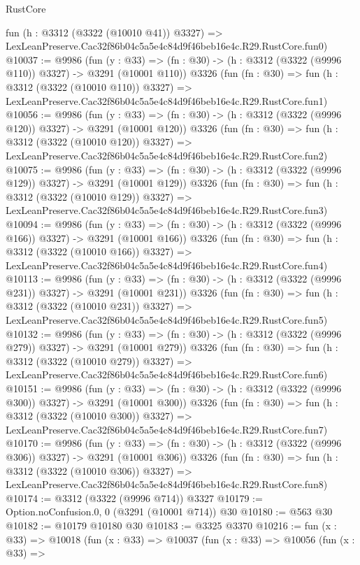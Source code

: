 \begin{lexlean}{RustCore}
\begin{coremodule}
    fun (h : @3312 (@3322 (@10010 @41)) @3327) =>
    LexLeanPreserve.Cac32f86b04c5a5e4c84d9f46beb16e4c.R29.RustCore.fun0)
@10037 := @9986
    (fun (y : @33) => (fn : @30) -> (h : @3312 (@3322 (@9996 @110)) @3327) -> @3291 (@10001 @110))
    @3326
    (fun (fn : @30) =>
    fun (h : @3312 (@3322 (@10010 @110)) @3327) =>
    LexLeanPreserve.Cac32f86b04c5a5e4c84d9f46beb16e4c.R29.RustCore.fun1)
@10056 := @9986
    (fun (y : @33) => (fn : @30) -> (h : @3312 (@3322 (@9996 @120)) @3327) -> @3291 (@10001 @120))
    @3326
    (fun (fn : @30) =>
    fun (h : @3312 (@3322 (@10010 @120)) @3327) =>
    LexLeanPreserve.Cac32f86b04c5a5e4c84d9f46beb16e4c.R29.RustCore.fun2)
@10075 := @9986
    (fun (y : @33) => (fn : @30) -> (h : @3312 (@3322 (@9996 @129)) @3327) -> @3291 (@10001 @129))
    @3326
    (fun (fn : @30) =>
    fun (h : @3312 (@3322 (@10010 @129)) @3327) =>
    LexLeanPreserve.Cac32f86b04c5a5e4c84d9f46beb16e4c.R29.RustCore.fun3)
@10094 := @9986
    (fun (y : @33) => (fn : @30) -> (h : @3312 (@3322 (@9996 @166)) @3327) -> @3291 (@10001 @166))
    @3326
    (fun (fn : @30) =>
    fun (h : @3312 (@3322 (@10010 @166)) @3327) =>
    LexLeanPreserve.Cac32f86b04c5a5e4c84d9f46beb16e4c.R29.RustCore.fun4)
@10113 := @9986
    (fun (y : @33) => (fn : @30) -> (h : @3312 (@3322 (@9996 @231)) @3327) -> @3291 (@10001 @231))
    @3326
    (fun (fn : @30) =>
    fun (h : @3312 (@3322 (@10010 @231)) @3327) =>
    LexLeanPreserve.Cac32f86b04c5a5e4c84d9f46beb16e4c.R29.RustCore.fun5)
@10132 := @9986
    (fun (y : @33) => (fn : @30) -> (h : @3312 (@3322 (@9996 @279)) @3327) -> @3291 (@10001 @279))
    @3326
    (fun (fn : @30) =>
    fun (h : @3312 (@3322 (@10010 @279)) @3327) =>
    LexLeanPreserve.Cac32f86b04c5a5e4c84d9f46beb16e4c.R29.RustCore.fun6)
@10151 := @9986
    (fun (y : @33) => (fn : @30) -> (h : @3312 (@3322 (@9996 @300)) @3327) -> @3291 (@10001 @300))
    @3326
    (fun (fn : @30) =>
    fun (h : @3312 (@3322 (@10010 @300)) @3327) =>
    LexLeanPreserve.Cac32f86b04c5a5e4c84d9f46beb16e4c.R29.RustCore.fun7)
@10170 := @9986
    (fun (y : @33) => (fn : @30) -> (h : @3312 (@3322 (@9996 @306)) @3327) -> @3291 (@10001 @306))
    @3326
    (fun (fn : @30) =>
    fun (h : @3312 (@3322 (@10010 @306)) @3327) =>
    LexLeanPreserve.Cac32f86b04c5a5e4c84d9f46beb16e4c.R29.RustCore.fun8)
@10174 := @3312 (@3322 (@9996 @714)) @3327
@10179 := Option.noConfusion.{0, 0} (@3291 (@10001 @714)) @30
@10180 := @563 @30
@10182 := @10179 @10180 @30
@10183 := @3325 @3370
@10216 := fun (x : @33) =>
  @10018
    (fun (x : @33) =>
    @10037
      (fun (x : @33) =>
      @10056
        (fun (x : @33) =>

\end{coremodule}
\end{lexlean}
